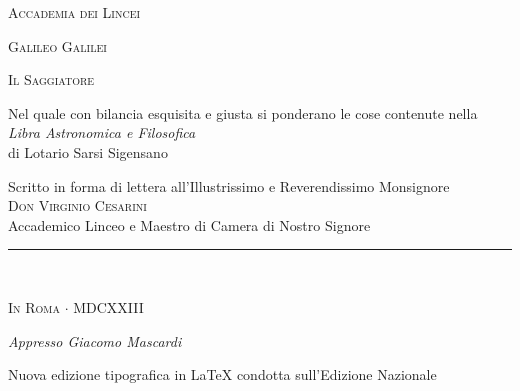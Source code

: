 \documentclass[11pt,twoside,openany]{book}
\begin{document}
\frontmatter

\begin{titlepage}
\centering
\vspace*{1cm}
{\large\scshape Accademia dei Lincei\par}
\vspace{0.8cm}
{\Large\scshape Galileo Galilei\par}
\vspace{1.0cm}
{\Huge\scshape\color{rubric} Il Saggiatore\par}
\vspace{0.6cm}
{\normalsize Nel quale con bilancia esquisita e giusta si ponderano le cose contenute nella\\
\textit{Libra Astronomica e Filosofica}\\
di Lotario Sarsi Sigensano\par}
\vspace{0.6cm}
{\small Scritto in forma di lettera all'Illustrissimo e Reverendissimo Monsignore\\
\textsc{Don Virginio Cesarini}\\
Accademico Linceo e Maestro di Camera di Nostro Signore\par}
\vfill
\rule{0.45\textwidth}{0.4pt}\\[0.5cm]
{\scshape In Roma $\cdot$ MDCXXIII\par}
{\small\itshape Appresso Giacomo Mascardi\par}
\vspace{0.6cm}
{\footnotesize Nuova edizione tipografica in \LaTeX{} condotta sull'Edizione Nazionale\par}
\end{titlepage}

\end{document}
